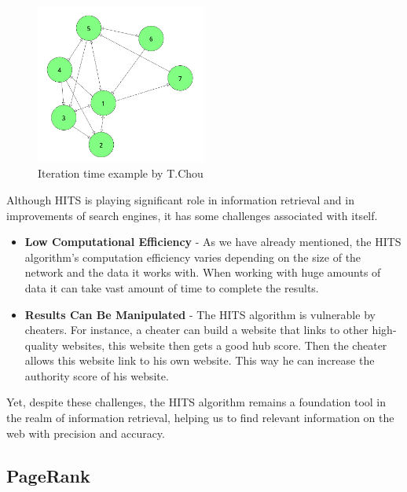 \documentclass[10pt,english,a4paper]{article}
\begin{document}
\begin{figure}
  \centering
  \includegraphics[width=0.5\textwidth]{comp_time_1.png}
  \caption{Iteration time example by T.Chou\cite{hits_article}}
  \label{comp_time}
\end{figure}

Although HITS is playing significant role in information retrieval and in improvements of search engines, it has some challenges associated with itself.
\begin{itemize}
  \item \textbf{Low Computational Efficiency} - As we have already mentioned, the HITS algorithm's computation efficiency varies depending on the size of the network and the data it works with. When working with huge amounts of data it can take vast amount of time to complete the results.
  \item \textbf{Results Can Be Manipulated} - The HITS algorithm is vulnerable by cheaters. For instance, a cheater can build a website that links to other high-quality websites, this website then gets a good hub score. Then the cheater allows this website link to his own website. This way he can increase the authority score of his website.  
\end{itemize}
Yet, despite these challenges, the HITS algorithm remains a foundation tool in the realm of information retrieval, helping us to find relevant information on the web with precision and accuracy.\cite{challenges_article}
\subsection{PageRank}\label{pagerank}
 

\end{document}
